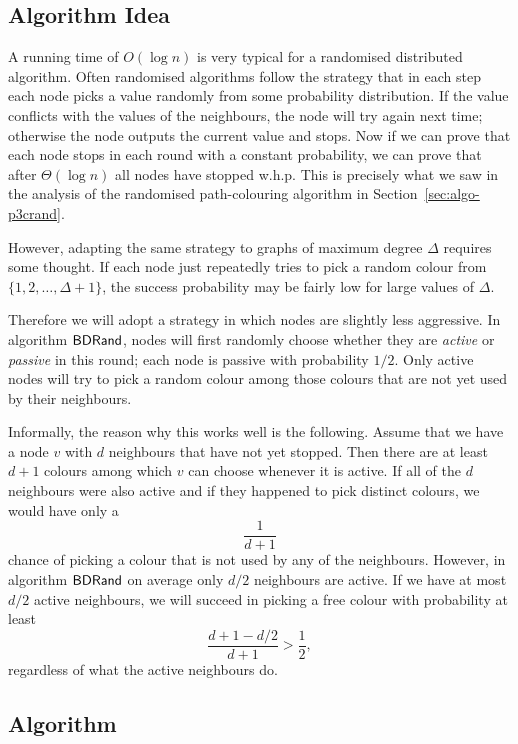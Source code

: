 \subsection{Algorithm Idea}

A running time of $O(\log n)$ is very typical for a randomised distributed algorithm. Often randomised algorithms follow the strategy that in each step each node picks a value randomly from some probability distribution. If the value conflicts with the values of the neighbours, the node will try again next time; otherwise the node outputs the current value and stops. Now if we can prove that each node stops in each round with a constant probability, we can prove that after $\Theta(\log n)$ all nodes have stopped w.h.p. This is precisely what we saw in the analysis of the randomised path-colouring algorithm in Section~\ref{sec:algo-p3crand}.

However, adapting the same strategy to graphs of maximum degree $\Delta$ requires some thought. If each node just repeatedly tries to pick a random colour from $\{1,2,\dotsc,\Delta+1\}$, the success probability may be fairly low for large values of $\Delta$.

Therefore we will adopt a strategy in which nodes are slightly less aggressive. In algorithm $\textup{\sffamily BDRand}$, nodes will first randomly choose whether they are \emph{active} or \emph{passive} in this round; each node is passive with probability $1/2$. Only active nodes will try to pick a random colour among those colours that are not yet used by their neighbours.

Informally, the reason why this works well is the following. Assume that we have a node $v$ with $d$ neighbours that have not yet stopped. Then there are at least $d+1$ colours among which $v$ can choose whenever it is active. If all of the $d$ neighbours were also active and if they happened to pick distinct colours, we would have only a \[\frac{1}{d+1}\] chance of picking a colour that is not used by any of the neighbours. However, in algorithm $\textup{\sffamily BDRand}$ on average only $d/2$ neighbours are active. If we have at most $d/2$ active neighbours, we will succeed in picking a free colour with probability at least \[\frac{d+1 - d/2}{d+1} > \frac{1}{2},\] regardless of what the active neighbours do.


\subsection{Algorithm}

